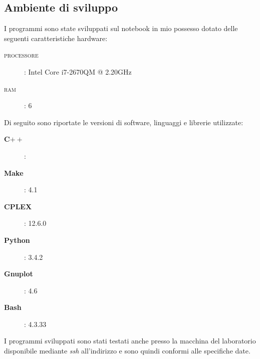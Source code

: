 \subsection{Ambiente di sviluppo}
\label{sec:ambiente}
I programmi sono state sviluppati sul notebook in mio possesso dotato delle seguenti caratteristiche hardware:
\begin{description}
\item[\textsc{processore}]: Intel Core i7-2670QM @ 2.20GHz
\item[\textsc{ram}]: 6
\end{description}

Di seguito sono riportate le versioni di software, linguaggi e librerie utilizzate:
\begin{description}
\item[\textbf{C$++$}]: 
\item[\textbf{Make}]: 4.1
\item[\textbf{CPLEX}]: 12.6.0
\item[\textbf{Python}]: 3.4.2
\item[\textbf{Gnuplot}]: 4.6
\item[\textbf{Bash}]: 4.3.33
\end{description}

I programmi sviluppati sono stati testati anche presso la macchina del laboratorio disponibile mediante \emph{ssh} all'indirizzo  e sono quindi conformi alle specifiche date.
